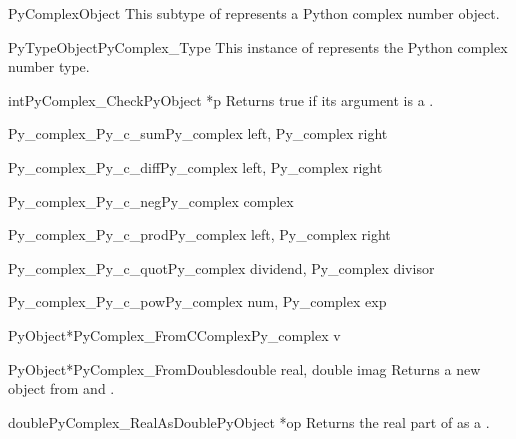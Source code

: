 \documentclass{manual}
\begin{document}
\begin{ctypedesc}{PyComplexObject}
This subtype of  represents a Python complex number object.
\end{ctypedesc}

\begin{cvardesc}{PyTypeObject}{PyComplex_Type}
This instance of  represents the Python complex 
number type.
\end{cvardesc}

\begin{cfuncdesc}{int}{PyComplex_Check}{PyObject *p}
Returns true if its argument is a .
\end{cfuncdesc}

\begin{cfuncdesc}{Py_complex}{_Py_c_sum}{Py_complex left, Py_complex right}
\end{cfuncdesc}

\begin{cfuncdesc}{Py_complex}{_Py_c_diff}{Py_complex left, Py_complex right}
\end{cfuncdesc}

\begin{cfuncdesc}{Py_complex}{_Py_c_neg}{Py_complex complex}
\end{cfuncdesc}

\begin{cfuncdesc}{Py_complex}{_Py_c_prod}{Py_complex left, Py_complex right}
\end{cfuncdesc}

\begin{cfuncdesc}{Py_complex}{_Py_c_quot}{Py_complex dividend,
                                          Py_complex divisor}
\end{cfuncdesc}

\begin{cfuncdesc}{Py_complex}{_Py_c_pow}{Py_complex num, Py_complex exp}
\end{cfuncdesc}

\begin{cfuncdesc}{PyObject*}{PyComplex_FromCComplex}{Py_complex v}
\end{cfuncdesc}

\begin{cfuncdesc}{PyObject*}{PyComplex_FromDoubles}{double real, double imag}
Returns a new  object from  and .
\end{cfuncdesc}

\begin{cfuncdesc}{double}{PyComplex_RealAsDouble}{PyObject *op}
Returns the real part of  as a \C{} .
\end{cfuncdesc}
\end{document}
